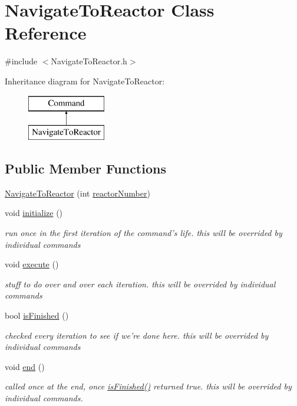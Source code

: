 \hypertarget{classNavigateToReactor}{\section{Navigate\-To\-Reactor Class Reference}
\label{classNavigateToReactor}
}


{\ttfamily \#include $<$Navigate\-To\-Reactor.\-h$>$}

Inheritance diagram for Navigate\-To\-Reactor\-:\begin{figure}[H]
\begin{center}
\leavevmode
\includegraphics[height=2.000000cm]{classNavigateToReactor}
\end{center}
\end{figure}
\subsection*{Public Member Functions}
\begin{DoxyCompactItemize}
\item 
\hyperlink{classNavigateToReactor_a66a709e79a4c6dc0e7583c9d9a47200d}{Navigate\-To\-Reactor} (int \hyperlink{classNavigateToReactor_ac0bd289bd96de0e58d94735bc16b3d44}{reactor\-Number})
\item 
void \hyperlink{classNavigateToReactor_a8b319bd246a3d1c818e38e82ed6ab25f}{initialize} ()
\begin{DoxyCompactList}\small\item\em run once in the first iteration of the command's life. this will be overrided by individual commands \end{DoxyCompactList}\item 
void \hyperlink{classNavigateToReactor_a50a9743b979ee2a5b35866bbad6f1faa}{execute} ()
\begin{DoxyCompactList}\small\item\em stuff to do over and over each iteration. this will be overrided by individual commands \end{DoxyCompactList}\item 
bool \hyperlink{classNavigateToReactor_ae1619462539af71d2ba9ea167db9dfaf}{is\-Finished} ()
\begin{DoxyCompactList}\small\item\em checked every iteration to see if we're done here. this will be overrided by individual commands \end{DoxyCompactList}\item 
void \hyperlink{classNavigateToReactor_a8d42713588dfb661c778ff6aad6c0085}{end} ()
\begin{DoxyCompactList}\small\item\em called once at the end, once \hyperlink{classNavigateToReactor_ae1619462539af71d2ba9ea167db9dfaf}{is\-Finished()} returned true. this will be overrided by individual commands. \end{DoxyCompactList}\end{DoxyCompactItemize}
